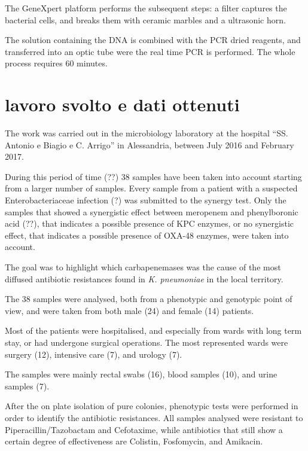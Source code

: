 \documentclass[11pt]{report}
\begin{document}
The GeneXpert platform performs the subsequent steps: a filter captures the bacterial cells, and breaks them with ceramic marbles and a ultrasonic horn.

The solution containing the DNA is combined with the PCR dried reagents, and transferred into an optic tube were the real time PCR is performed.
The whole process requires 60 minutes.

\chapter{lavoro svolto e dati ottenuti}

The work was carried out in the microbiology laboratory at the hospital ``SS. Antonio e Biagio e C. Arrigo'' in Alessandria, between July 2016 and February 2017.

During this period of time (??) 38 samples have been taken into account starting from a larger number of samples.
Every sample from a patient with a suspected Enterobacteriaceae infection (?) was submitted to the synergy test.
Only the samples that showed a synergistic effect between meropenem and phenylboronic acid (??), that indicates a possible presence of KPC enzymes, or no synergistic effect, that indicates a possible presence of OXA-48 enzymes, were taken into account.

The goal was to highlight which carbapenemases was the cause of the most diffused antibiotic resistances found in \emph{K. pneumoniae} in the local territory.

The 38 samples were analysed, both from a phenotypic and genotypic point of view, and were taken from both male (24) and female (14) patients.

Most of the patients were hospitalised, and especially from wards with long term stay, or had undergone surgical operations.
The most represented wards were surgery (12), intensive care (7), and urology (7).


The samples were mainly rectal swabs (16), blood samples (10), and urine samples (7).


After the on plate isolation of pure colonies, phenotypic tests were performed in order to identify the antibiotic resistances. 
All samples analysed were resistant to Piperacillin/Tazobactam and Cefotaxime, while antibiotics that still show a certain degree of effectiveness are Colistin, Fosfomycin, and Amikacin.
\end{document}
